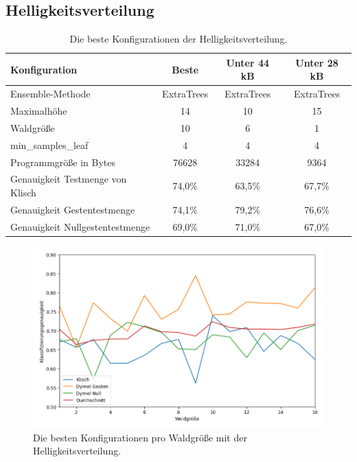 \subsection{Helligkeitsverteilung}
\begin{table}[h!]
    \centering
    \begin{tabular}{ | l | c | c | c |}
        \hline
        Konfiguration & Beste & Unter 44 kB & Unter 28 kB \\\hline
        Ensemble-Methode & ExtraTrees & ExtraTrees & ExtraTrees \\\hline
        Maximalhöhe & 14 & 10 & 15 \\\hline
        Waldgröße & 10 & 6 & 1 \\\hline
        min\_samples\_leaf & 4 & 4 & 4 \\\hline
        Programmgröße in Bytes & 76628 & 33284 & 9364 \\\hline
        Genauigkeit Testmenge von Klisch & 74,0\% & 63,5\% & 67,7\% \\\hline
        Genauigkeit Gestentestmenge & 74,1\% & 79,2\% & 76,6\% \\\hline
        Genauigkeit Nullgestentestmenge & 69,0\% & 71,0\% & 67,0\% \\\hline
    \end{tabular}
    \caption{Die beste Konfigurationen der Helligkeitsverteilung.}
    \label{tab:helligkeitsverteilung}
\end{table}
\begin{figure}[h!]
    \centering
    \includegraphics[width=\linewidth]{images/helligkeitsverteilung_acc_per_size.png}
    \caption{Die besten Konfigurationen pro Waldgröße mit der Helligkeitsverteilung.}
    \label{fig:helligkeitsverteilung_per_forest_size}
\end{figure}
